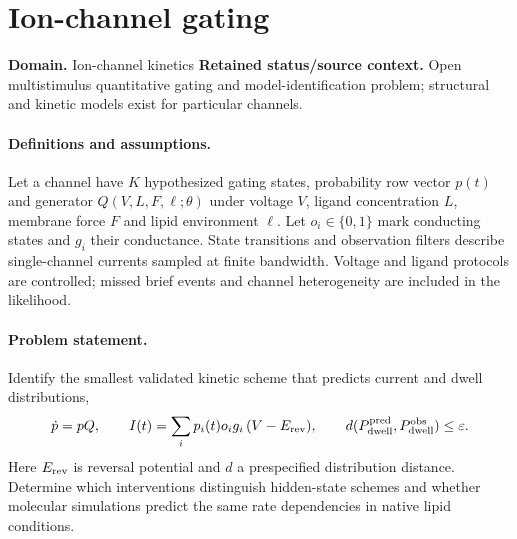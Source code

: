 \documentclass[11pt]{article}
\begin{document}
\section*{Ion-channel gating}
\label{prob:086}
\label{rank:133}
\par\smallskip

\noindent\textbf{Domain.} Ion-channel kinetics \quad \textbf{Retained status/source context.} Open multistimulus quantitative gating and model-identification problem; structural and kinetic models exist for particular channels.
\paragraph{Definitions and assumptions.} Let a channel have $K$ hypothesized gating states, probability row vector $p(t)$ and generator $Q(V,L,F,\ell;\theta)$ under voltage $V$, ligand concentration $L$, membrane force $F$ and lipid environment $\ell$. Let $o_i\in\{0,1\}$ mark conducting states and $g_i$ their conductance. State transitions and observation filters describe single-channel currents sampled at finite bandwidth. Voltage and ligand protocols are controlled; missed brief events and channel heterogeneity are included in the likelihood.
\paragraph{Problem statement.} Identify the smallest validated kinetic scheme that predicts current and dwell distributions,
\[\dot p=pQ,\qquad I(t)=\sum_i p_i(t)o_i g_i\,(V-E_{\rm rev}),\qquad d(P_{\rm dwell}^{\rm pred},P_{\rm dwell}^{\rm obs})\le\varepsilon.\]
Here $E_{\rm rev}$ is reversal potential and $d$ a prespecified distribution distance. Determine which interventions distinguish hidden-state schemes and whether molecular simulations predict the same rate dependencies in native lipid conditions.
\end{document}
